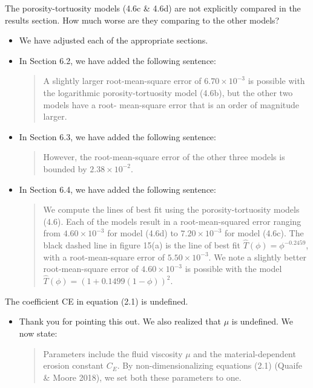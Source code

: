 \documentclass[11pt]{article}
\newcommand{\comment}[1]{{\color{blue} #1}}
\begin{document}
\noindent
\comment{The porosity-tortuosity models (4.6c \& 4.6d) are not
explicitly compared in the results section. How much worse are they
comparing to the other models?}
\begin{itemize}
  \item We have adjusted each of the appropriate sections.

  \item In Section 6.2, we have added the following sentence:
    \begin{quotation}
      \noindent
      A slightly larger root-mean-square error of $6.70 \times 10^{-3}$
      is possible with the logarithmic porosity-tortuosity model (4.6b),
      but the other two models have a root- mean-square error that is an
      order of magnitude larger.
    \end{quotation}


  \item In Section 6.3, we have added the following sentence:
    \begin{quotation}
      \noindent
      However, the root-mean-square error of the other three models is
      bounded by $2.38 \times 10^{-2}$.
    \end{quotation}

  \item In Section 6.4, we have added the following sentence:
    \begin{quotation}
      \noindent
      We compute the lines of best fit using the porosity-tortuosity
      models (4.6).  Each of the models result in a root-mean-squared
      error ranging from $4.60 \times 10^{-3}$ for model (4.6d) to $7.20
      \times 10^{-3}$ for model (4.6c). The black dashed line in figure
      15(a) is the line of best fit $\widehat{T}(\phi) =
      \phi^{-0.2459}$, with a root-mean-square error of $5.50 \times
      10^{-3}$.  We note a slightly better root-mean-square error of
      $4.60 \times 10^{-3}$ is possible with the model
      $\widehat{T}(\phi) = \left(1 + 0.1499(1-\phi)\right)^2$.
    \end{quotation}

\end{itemize}

\noindent
\comment{The coefficient CE in equation (2.1) is undefined.}
\begin{itemize}
  \item Thank you for pointing this out. We also realized that $\mu$ is
  undefined. We now state:
  \begin{quotation}
    \noindent
    Parameters include the fluid viscosity $\mu$ and the
    material-dependent erosion constant $C_E$. By non-dimensionalizing
    equations (2.1) (Quaife \& Moore 2018), we set both these parameters
    to one.
  \end{quotation}
\end{itemize}
\end{document}
